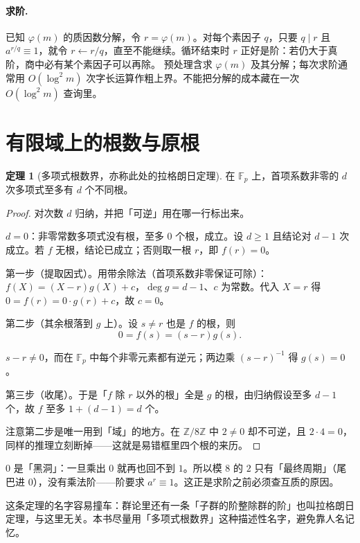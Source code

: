 \documentclass[UTF8,a4paper,11pt,oneside,openany,fontset=fandol]{ctexbook}
\theoremstyle{definition}
\newtheorem{theorem}[definition]{定理}
\newcommand{\Z}{\mathbb Z}
\begin{document}
\paragraph{求阶.} 已知 $\varphi(m)$ 的质因数分解，令 $r=\varphi(m)$。对每个素因子 $q$，只要 $q\mid r$ 且 $a^{r/q}\equiv1$，就令 $r\gets r/q$，直至不能继续。循环结束时 $r$ 正好是阶：若仍大于真阶，商中必有某个素因子可以再除。
预处理含求 $\varphi(m)$ 及其分解；每次求阶通常用 $O(\log^2m)$ 次字长运算作粗上界。不能把分解的成本藏在一次 $O(\log^2m)$ 查询里。


\section{有限域上的根数与原根}
\begin{theorem}[多项式根数界，亦称此处的拉格朗日定理]
在 $\mathbb F_p$ 上，首项系数非零的 $d$ 次多项式至多有 $d$ 个不同根。
\end{theorem}
\begin{proof}
对次数 $d$ 归纳，并把「可逆」用在哪一行标出来。

$d=0$：非零常数多项式没有根，至多 $0$ 个根，成立。设 $d\ge1$ 且结论对 $d-1$ 次成立。若 $f$ 无根，结论已成立；否则取一根 $r$，即 $f(r)=0$。

第一步（提取因式）。用带余除法（首项系数非零保证可除）：$f(X)=(X-r)g(X)+c$，$\deg g=d-1$、$c$ 为常数。代入 $X=r$ 得 $0=f(r)=0\cdot g(r)+c$，故 $c=0$。

第二步（其余根落到 $g$ 上）。设 $s\ne r$ 也是 $f$ 的根，则
\[
 0=f(s)=(s-r)g(s).
\]




$s-r\ne0$，而在 $\mathbb F_p$ 中每个非零元素都有逆元；两边乘 $(s-r)^{-1}$ 得 $g(s)=0$。

第三步（收尾）。于是「$f$ 除 $r$ 以外的根」全是 $g$ 的根，由归纳假设至多 $d-1$ 个，故 $f$ 至多 $1+(d-1)=d$ 个。

注意第二步是唯一用到「域」的地方。在 $\Z/8\Z$ 中 $2\ne0$ 却不可逆，且 $2\cdot4=0$，同样的推理立刻断掉——这就是易错框里四个根的来历。
\end{proof}

\begin{tip}
$0$ 是「黑洞」：一旦乘出 $0$ 就再也回不到 $1$。所以模 $8$ 的 $2$ 只有「最终周期」（尾巴进 $0$），没有乘法阶——阶要求 $a^r\equiv1$。这正是求阶之前必须查互质的原因。
\end{tip}


\begin{tip}
这条定理的名字容易撞车：群论里还有一条「子群的阶整除群的阶」也叫拉格朗日定理，与这里无关。本书尽量用「多项式根数界」这种描述性名字，避免靠人名记忆。
\end{tip}
\end{document}
